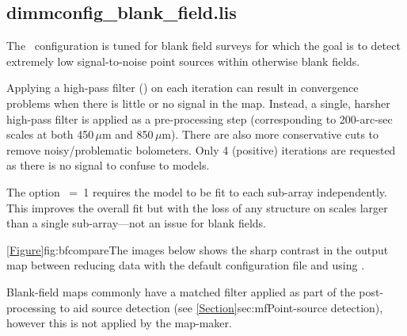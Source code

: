 \subsection{dimmconfig\_blank\_field.lis}

The \blankfield\ configuration is tuned for blank field surveys for which the goal
is to detect extremely low signal-to-noise point sources within otherwise
blank fields.

Applying a high-pass filter () on each iteration can result in
convergence problems when there is little or no signal in the
map. Instead, a single, harsher high-pass filter is applied as a
pre-processing step (corresponding to 200-arc-sec scales at both
450\,$\mu$m and 850\,$\mu$m). There are also more conservative cuts to
remove noisy/problematic bolometers. Only 4 (positive) iterations are
requested as there is no signal to confuse to models.

The option ~=~1 requires the  model to
be fit to each sub-array independently. This improves the overall fit
but with the loss of any structure on scales larger than a single
sub-array---not an issue for blank fields.

\cref{Figure}{fig:bfcompare}{The images below} shows the sharp
contrast in the output map between reducing data with the default
configuration file and using .

Blank-field maps commonly have a matched filter applied as part of the
post-processing to aid source detection (see
\cref{Section}{sec:mf}{Point-source detection}), however this is not
applied by the map-maker.

